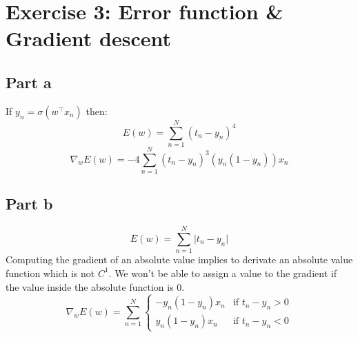 \section{Exercise 3: Error function \& Gradient descent}
\subsection{Part a}
If $y_n = \sigma(w^\top x_n)$ then:
$$
E(w) = \sum_{n=1}^N (t_n-y_n)^4
$$
$$
\nabla_w E(w) = -4\sum_{n=1}^N (t_n-y_n)^3(y_n (1-y_n))x_n
$$

\subsection{Part b}
$$
E(w) = \sum_{n=1}^N \vert t_n - y_n \vert
$$
Computing the gradient of an absolute value implies to derivate an
absolute value function which  is not $C^1$. We won't be able to assign 
a value to the gradient if the value inside the absolute function is 0.
$$
\nabla_w E(w) = \sum_{n=1}^N \left\{ \begin{array}{ll}  
                    -y_n(1-y_n)x_n & \text{if $t_n-y_n > 0$}
                \\ 
                    y_n(1-y_n)x_n & \text{if $t_n-y_n < 0$}
                        \end{array}
                \right.
$$
